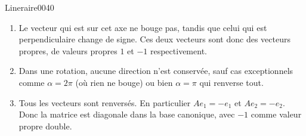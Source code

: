 \begin{corrige}{Lineraire0040}

	\begin{enumerate}

		\item
			
            
            Le vecteur qui est sur cet axe ne bouge pas, tandis que celui qui est perpendiculaire change de signe. Ces deux vecteurs sont donc des vecteurs propres, de valeurs propres $1$ et $-1$ respectivement.

		\item
			Dans une rotation, aucune direction n'est conservée, sauf cas exceptionnels comme $\alpha=2\pi$ (où rien ne bouge) ou bien $\alpha=\pi$ qui renverse tout.

		\item
			Tous les vecteurs sont renversés. En particulier $Ae_1=-e_1$ et $Ae_2=-e_2$. Donc la matrice est diagonale dans la base canonique, avec $-1$ comme valeur propre double.

	\end{enumerate}
	


\end{corrige}
